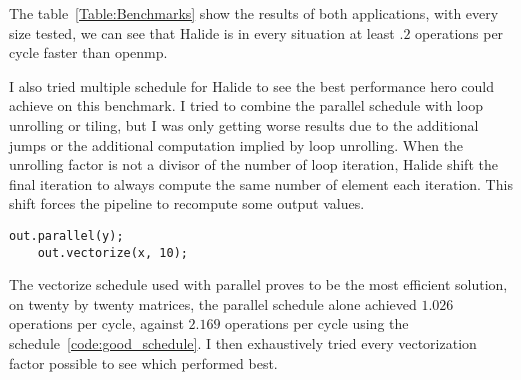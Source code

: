 	The table~\ref{Table:Benchmarks} show the results of both applications, with every size tested, we can see that Halide is in every situation at least $.2$ operations per cycle faster than \gls{openmp}.




I also tried multiple schedule for Halide to see the best performance \gls{hero} could achieve on this benchmark. I tried to combine the parallel schedule with loop unrolling or tiling, but I was only getting worse results due to the additional jumps or the additional computation implied by loop unrolling. When the unrolling factor is not a divisor of the number of loop iteration, Halide shift the final iteration to always compute the same number of element each iteration. This shift forces the pipeline to recompute some output values.

\lstset{basicstyle=\ttfamily\footnotesize,breaklines=true,tabsize=2}
\begin{lstlisting}[caption={Schedule using Parallel and Vectorize}, captionpos=b, label={code:good_schedule}]
	out.parallel(y);
	out.vectorize(x, 10);

\end{lstlisting}

	The vectorize schedule used with parallel proves to be the most efficient solution, on twenty by twenty matrices, the parallel schedule alone achieved $1.026$ operations per cycle, against $2.169$ operations per cycle using the schedule~\ref{code:good_schedule}.
	I then exhaustively tried every vectorization factor possible to see which performed best.


